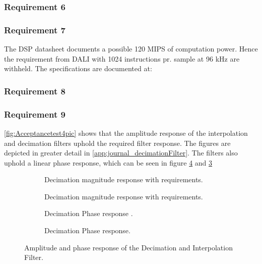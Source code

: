 \subsubsection*{Requirement 6}

\subsubsection*{Requirement 7}
The DSP datasheet documents a possible 120 MIPS of computation power. Hence the requirement from DALI with 1024 instructions pr. sample at 96 kHz are withheld. The specifications are documented at:


\subsubsection*{Requirement 8}

\subsubsection*{Requirement 9}
\autoref{fig:Acceptancetest4pic} shows that the amplitude response of the interpolation and decimation filters uphold the required filter response. The figures are depicted in greater detail in \autoref{app:journal_decimationFilter}. The filters also uphold a linear phase response, which can be seen in figure \ref{fig:AcceptIntPhase2} and \ref{fig:AcceptDecPhase2}
\begin{figure}[H]
\centering
\begin{subfigure}[t]{0.45\textwidth}
	\centering
	
	\caption{Decimation magnitude response with requirements.}
	\label{fig:acceptDecMag2}
\end{subfigure}
\hfill
\begin{subfigure}[t]{0.45\textwidth}
	\centering
	
	\caption{Decimation magnitude response with requirements.}
	\label{fig:acceptIntMag2}
\end{subfigure} 
\begin{subfigure}[t]{0.45\textwidth}
	\centering
	
	\caption{Decimation Phase response .}
	\label{fig:AcceptDecPhase2}
\end{subfigure} 
\hfill
\begin{subfigure}[t]{0.45\textwidth}
	\centering
	
	\caption{Decimation Phase response.}
	\label{fig:AcceptIntPhase2}
\end{subfigure} 
\caption{Amplitude and phase response of the Decimation and Interpolation Filter.}
\label{fig:Acceptancetest4pic}
\end{figure}






